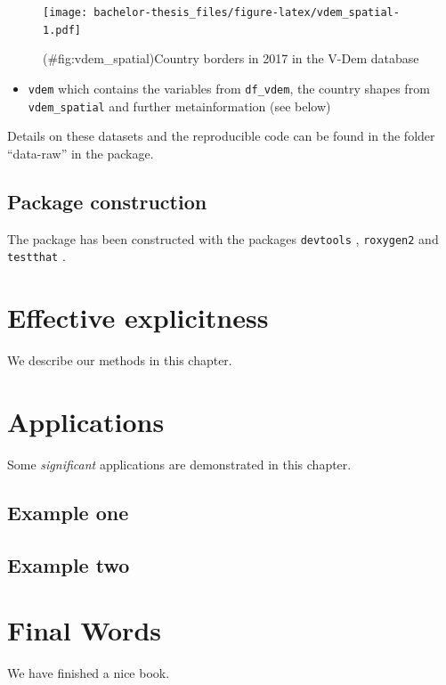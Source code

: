 \documentclass[]{report}
\providecommand{\tightlist}{%
  \setlength{\itemsep}{0pt}\setlength{\parskip}{0pt}}
\theoremstyle{definition}
\theoremstyle{definition}
\theoremstyle{definition}
\theoremstyle{remark}
\begin{document}
\begin{figure}
\centering
\texttt{[image: bachelor-thesis\_files/figure-latex/vdem\_spatial-1.pdf]}
\caption{(\#fig:vdem\_spatial)Country borders in 2017 in the V-Dem
database}
\end{figure}

\begin{itemize}
\tightlist
\item
  \texttt{vdem} which contains the variables from \texttt{df\_vdem}, the
  country shapes from \texttt{vdem\_spatial} and further metainformation
  (see below)
\end{itemize}

Details on these datasets and the reproducible code can be found in the
folder ``data-raw'' in the package.

\section{Package construction}\label{package-construction}

The package has been constructed with the packages \texttt{devtools}
\citep{devtools}, \texttt{roxygen2} \citep{roxygen2} and
\texttt{testthat} \citep{testthat}.

\chapter{Effective explicitness}\label{effective-explicitness}

We describe our methods in this chapter.

\chapter{Applications}\label{applications}

Some \emph{significant} applications are demonstrated in this chapter.

\section{Example one}\label{example-one}

\section{Example two}\label{example-two}

\chapter{Final Words}\label{final-words}

We have finished a nice book.


\end{document}
